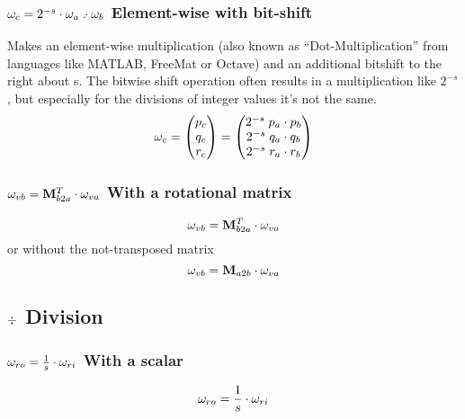\subsubsection*{$\omega_{c} = 2^{-s} \cdot \omega_{a} \;. \! \!\cdot \omega_{b}$ Element-wise with bit-shift}
Makes an element-wise multiplication (also known as ``Dot-Multiplication'' from languages like MATLAB, FreeMat or Octave) and an additional bitshift to the right about s. The bitwise shift operation often results in a multiplication like $2^{-s}$, but especially for the divisions of integer values it's not the same.
\begin{equation}
\omega_{c} = \begin{pmatrix}p_c\\q_c\\r_c\end{pmatrix} = 
\begin{pmatrix}
2^{-s} \; p_a \cdot p_b \\
2^{-s} \; q_a \cdot q_b \\
2^{-s} \; r_a \cdot r_b
\end{pmatrix}
\end{equation}

\subsubsection*{$ \omega_{vb} = \mathbf{M}_{b2a}^{T} \cdot \omega_{va}$ With a rotational matrix}
\begin{equation}
\omega_{vb} = \mathbf{M}_{b2a}^{T} \cdot \omega_{va}
\end{equation}
or without the not-transposed matrix
\begin{equation}
\omega_{vb} = \mathbf{M}_{a2b} \cdot \omega_{va}
\end{equation}



\subsection{$\div$ Division}
\subsubsection*{$\omega_{ro} = \frac 1 s \cdot \omega_{ri}$ With a scalar}
\begin{equation}
\omega_{ro} = \frac 1 s \cdot \omega_{ri}
\end{equation}


